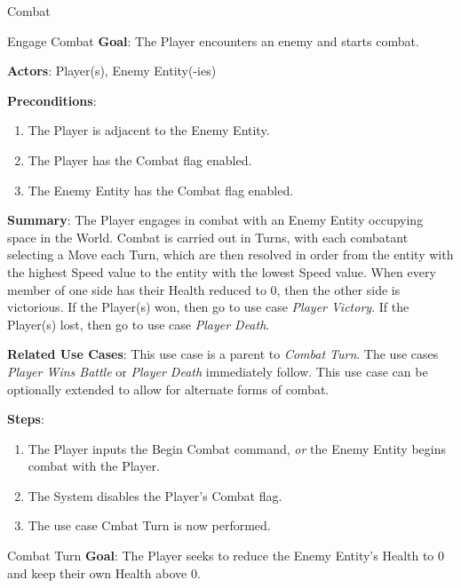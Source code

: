 \documentclass[12pt]{report}
\begin{document}
  \begin{section}{Combat}
    \begin{subsection}{Engage Combat}
      \textbf{Goal}:
      The Player encounters an enemy and starts combat.
      
      \textbf{Actors}:
      Player(s), Enemy Entity(-ies)


      \textbf{Preconditions}:
      \begin{enumerate}
        \item The Player is adjacent to the Enemy Entity.
        \item The Player has the Combat flag enabled.
        \item The Enemy Entity has the Combat flag enabled.
      \end{enumerate}

      \textbf{Summary}:
      The Player engages in combat with an Enemy Entity occupying space in the
      World. Combat is carried out in Turns, with each combatant selecting a Move
      each Turn, which are then resolved in order from the entity with the
      highest Speed value to the entity with the lowest Speed value. When every
      member of one side has their Health reduced to 0, then the other side is
      victorious. If the Player(s) won, then go to use case \textit {Player Victory}. 
      If the Player(s) lost, then go to use case \textit{Player Death}.

      \textbf{Related Use Cases}:
      This use case is a parent to \textit{Combat Turn}. The use cases
      \textit{Player Wins Battle} or \textit{Player Death} immediately follow. This
      use case can be optionally extended to allow for alternate forms of combat.

      \textbf{Steps}:
      \begin{enumerate}
        \item The Player inputs the Begin Combat command, \textit{or} the Enemy
        Entity begins combat with the Player.
        \item The System disables the Player's Combat flag.
        \item The use case Cmbat Turn is now performed.
      \end{enumerate}
    \end{subsection}


    \begin{subsection}{Combat Turn}
       \textbf{Goal}:
      The Player seeks to reduce the Enemy Entity's Health to 0 and keep their
      own Health above 0.
      

\end{subsection}
\end{section}
\end{document}
